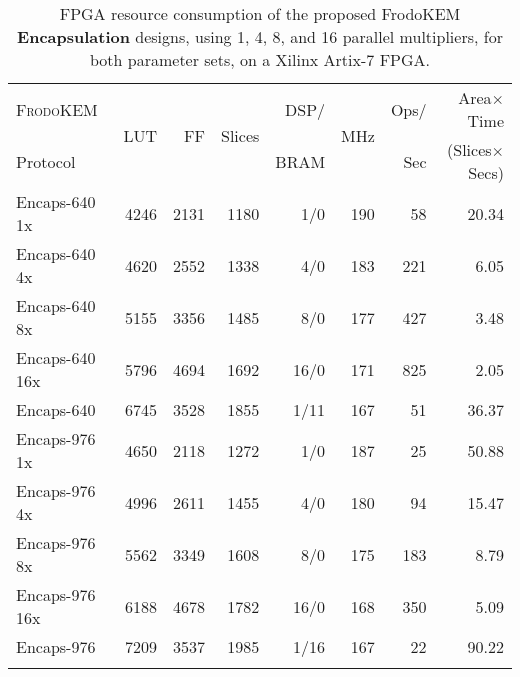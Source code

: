 \begin{table*}
\centering
\caption{FPGA resource consumption of the proposed FrodoKEM \textbf{Encapsulation} designs, using 1, 4, 8, and 16 parallel multipliers, for both parameter sets, on a Xilinx Artix-7 FPGA.}\label{tab:encapsresults}

\begin{tabular}{l r r r r r r r}
\hline \Tstrut
  \textsc{FrodoKEM} & \multirow{2}{*}{LUT} & \multirow{2}{*}{FF} & \multirow{2}{*}{Slices} & DSP/ & \multirow{2}{*}{MHz} & Ops/ & Area$\times$Time \\
Protocol &&&& BRAM && Sec & (Slices$\times$Secs) \\ \hline \Tstrut

Encaps-640 1x & 4246 & 2131 & 1180 & 1/0 & 190 & 58 & 20.34 \\
Encaps-640 4x & 4620 & 2552 & 1338 & 4/0 & 183 & 221 & 6.05 \\
Encaps-640 8x & 5155 & 3356 & 1485 & 8/0 & 177 & 427 & 3.48 \\
Encaps-640 16x & 5796 & 4694 & 1692 & 16/0 & 171 & 825 & 2.05 \\ \hline \Tstrut
Encaps-640 \cite{howe2018standard} & 6745 & 3528 & 1855 & 1/11 & 167 & 51 & 36.37 \\ \hline \Tstrut


Encaps-976 1x & 4650 & 2118 & 1272 & 1/0 & 187 & 25 & 50.88 \\
Encaps-976 4x & 4996 & 2611 & 1455 & 4/0 & 180 & 94 & 15.47 \\
Encaps-976 8x & 5562 & 3349 & 1608 & 8/0 & 175 & 183 & 8.79 \\
Encaps-976 16x & 6188 & 4678 & 1782 & 16/0 & 168 & 350 & 5.09 \\ \hline \Tstrut

Encaps-976 \cite{howe2018standard} & 7209 & 3537 & 1985 & 1/16 & 167 & 22 & 90.22 \\ \hline \Tstrut

\end{tabular}%
\end{table*}


